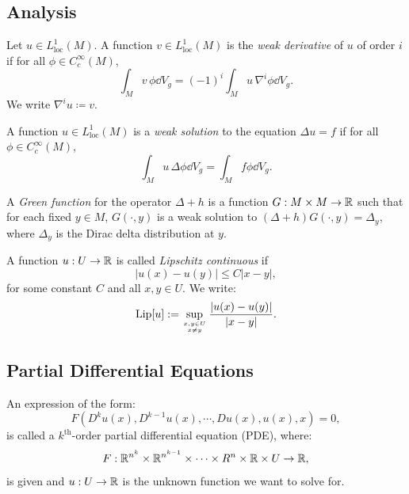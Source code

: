 \subsection{Analysis}

\begin{definition}
  Let $u \in L^1_{\text{loc}}(M)$. A function $v \in L^1_{\text{loc}}(M)$ is the \emph{weak derivative} of $u$ of order $i$ if for all $\phi \in C^\infty_c(M)$,
  \[%
    \int_M v \, \phi \dd{V}_g = (-1)^i \int_M u \, \nabla^i \phi \dd{V}_g
  .\]%
  We write $\nabla^i u \coloneqq v$.
\end{definition}

\begin{definition}
  A function $u \in L^1_{\text{loc}}(M)$ is a \emph{weak solution} to the equation $\Delta u = f$ if for all $\phi \in C^\infty_c(M)$,
  \[%
    \int_M u \, \Delta\phi \dd{V}_g = \int_M f \phi \dd{V}_g
  .\]%
\end{definition}

\begin{definition}
  A \emph{Green function} for the operator $\Delta + h$ is a function $G : M \times M \rightarrow \mathbb{R}$ such that for each fixed $y \in M$, $G(\cdot, y)$ is a weak solution to $(\Delta + h)G(\cdot, y) = \Delta_y$, where $\Delta_y$ is the Dirac delta distribution at $y$.
\end{definition}

\begin{definition}
  A function $u : U \rightarrow \mathbb{R}$ is called \emph{Lipschitz continuous} if
  \[%
    |u(x) - u(y)| \le C|x - y|
  ,\]%
  for some constant $C$ and all $x, y \in U$. We write:
  \[%
    \Lip[u] := \sup_{x,y \in U \atop x \neq y} \frac{|u(x) - u(y)|}{|x - y|}
  .\]%
\end{definition}

\subsection{Partial Differential Equations}

\begin{definition}
  An expression of the form:
  \begin{equation}\label{eq:general_pde_form}
    F(D^ku(x), D^{k-1}u(x), \cdots, Du(x), u(x), x) = 0
  ,\end{equation}
  is called a $k^{\text{th}}$-order partial differential equation (PDE), where:
  \[%
    F : \R^{n^k} \times \R^{n^{k-1}} \times \cdots \times R^n \times \R \times U \to \R
  ,\]%
  is given and $u : U \rightarrow \mathbb{R}$ is the unknown function we want to solve for.
\end{definition}


